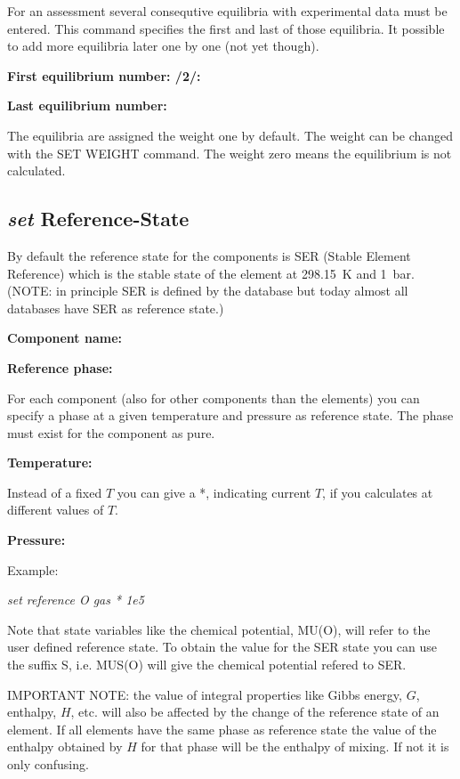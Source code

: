 \documentclass[11pt]{article}
\begin{document}
For an assessment several consequtive equilibria with experimental
data must be entered.  This command specifies the first and last of
those equilibria.  It possible to add more equilibria later one by
one (not yet though).  

\hypertarget{First equilibrium number:}{{\bf First equilibrium number: /2/:}}

{\bf Last equilibrium number:}

The equilibria are assigned the weight one by default.  The weight can
be changed with the SET WEIGHT command.  The weight zero means the
equilibrium is not calculated.

\hypertarget{Set reference phase}{}
\subsection{{\em set} Reference-State}\label{sc:setref}

By default the reference state for the components is SER (Stable
Element Reference) which is the stable state of the element at
298.15~K and 1~bar.  (NOTE: in principle SER is defined by the database
but today almost all databases have SER as reference state.)

{\bf Component name:}

{\bf Reference phase:}

For each component (also for other components than the elements) you
can specify a phase at a given temperature and pressure as reference
state.  The phase must exist for the component as pure.

{\bf Temperature:}

Instead of a fixed $T$ you can give a *, indicating current $T$, if
you calculates at different values of $T$.

{\bf Pressure:}

Example:

{\em set reference O gas * 1e5}

Note that state variables like the chemical potential, MU(O), will
refer to the user defined reference state.  To obtain the value for
the SER state you can use the suffix S, i.e. MUS(O) will give the
chemical potential refered to SER.

IMPORTANT NOTE: the value of integral properties like Gibbs energy,
$G$, enthalpy, $H$, etc. will also be affected by the change of the
reference state of an element.  If all elements have the same phase as
reference state the value of the enthalpy obtained by $H$ for that
phase will be the enthalpy of mixing.  If not it is only confusing.
\end{document}
